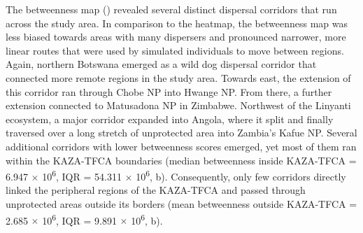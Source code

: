 \documentclass[../FinalThesis.tex]{subfiles}
\begin{document}
The betweenness map () revealed several distinct dispersal
corridors that run across the study area. In comparison to the heatmap, the
betweenness map was less biased towards areas with many dispersers and
pronounced narrower, more linear routes that were used by simulated individuals
to move between regions. Again, northern Botswana emerged as a wild dog
dispersal corridor that connected more remote regions in the study area. Towards
east, the extension of this corridor ran through Chobe NP into Hwange NP. From
there, a further extension connected to Matusadona NP in Zimbabwe. Northwest of
the Linyanti ecosystem, a major corridor expanded into Angola, where it split
and finally traversed over a long stretch of unprotected area into Zambia's
Kafue NP. Several additional corridors with lower betweenness scores emerged,
yet most of them ran within the KAZA-TFCA boundaries (median betweenness inside
KAZA-TFCA = 6.947 \(\times\) 10\textsuperscript{6}, IQR = 54.311 \(\times\)
10\textsuperscript{6}, b). Consequently, only few corridors
directly linked the peripheral regions of the KAZA-TFCA and passed through
unprotected areas outside its borders (mean betweenness outside KAZA-TFCA =
2.685 \(\times\) 10\textsuperscript{6}, IQR = 9.891 \(\times\)
10\textsuperscript{6}, b).
\end{document}
